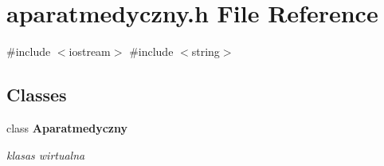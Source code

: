 \section{aparatmedyczny.\+h File Reference}
\label{aparatmedyczny_8h}
{\ttfamily \#include $<$iostream$>$}\newline
{\ttfamily \#include $<$string$>$}\newline
\subsection*{Classes}
\begin{DoxyCompactItemize}
\item 
class \textbf{ Aparatmedyczny}
\begin{DoxyCompactList}\small\item\em klasas wirtualna \end{DoxyCompactList}\end{DoxyCompactItemize}
